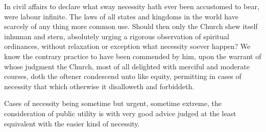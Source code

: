 In civil affairs to declare what sway necessity hath ever been accustomed to bear, were labour infinite. The laws of all states and kingdoms in the world have scarcely of any thing more common use. Should then only the Church shew itself inhuman and stern, absolutely urging a rigorous observation of spiritual ordinances, without relaxation or exception what necessity soever happen? We know the contrary practice to have been commended by him, upon the warrant of whose judgment the Church, most of all delighted with merciful and moderate courses, doth the oftener condescend unto like equity, permitting in cases of necessity that which otherwise it disalloweth and forbiddeth.

Cases of necessity being sometime but urgent, sometime extreme, the consideration of public utility is with very good  advice judged at the least equivalent with the easier kind of necessity.

